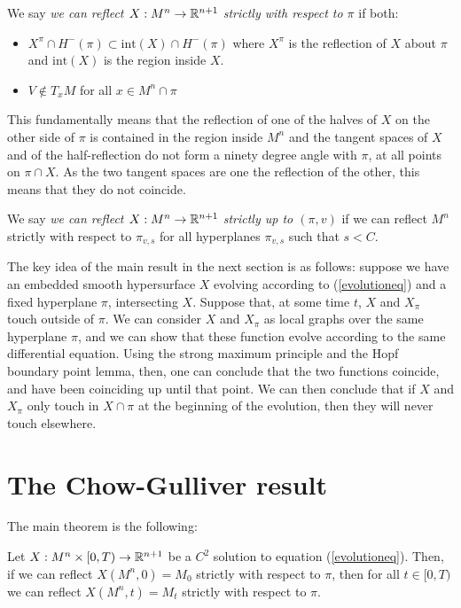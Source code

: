\begin{defin}
	We say {\em we can reflect $X: M^n\rightarrow \mathbb{R}^{n+1}$ strictly with respect to $\pi$} if both:
	\begin{itemize}
		\item $X^\pi\cap H^-(\pi)\subset \mathrm{int}(X)\cap H^-(\pi)$ where $X^\pi$ is the reflection of $X$ about $\pi$ and $\mathrm{int}(X)$ is the region inside $X$.
		\item $V\notin T_xM$ for all $x\in M^n \cap\pi$
	\end{itemize} 
\end{defin}
This fundamentally means that the reflection of one of the halves of $X$ on the other side of $\pi$ is contained in the region inside $M^n$ and the tangent spaces of $X$ and of the half-reflection do not form a ninety degree angle with $\pi$, at all points on $\pi\cap X$. As the two tangent spaces are one the reflection of the other, this means that they do not coincide.   
\begin{defin}
	We say {\em we can reflect $X: M^n\rightarrow \mathbb{R}^{n+1}$ strictly up to $(\pi,v)$} if we can reflect $M^n$ strictly with respect to $\pi_{v, s}$ for all hyperplanes $\pi_{v, s}$ such that $s<C$.  
\end{defin}

The key idea of the main result in the next section is as follows: suppose we have an embedded smooth hypersurface $X$ evolving according to (\ref{evolutioneq}) and a fixed hyperplane $\pi$, intersecting $X$. Suppose that, at some time $t$, $X$ and  $X_\pi$ touch outside of $\pi$. We can consider $X$ and  $X_\pi$ as local graphs over the same hyperplane $\pi$, and we can show that these function evolve according to the same differential equation. Using the strong maximum principle and the Hopf boundary point lemma, then, one can conclude that the two functions coincide, and have been coinciding up until that point. We can then conclude that if  $X$ and  $X_\pi$ only touch in $X\cap\pi$ at the beginning of the evolution, then they will never touch elsewhere.  


\section{The Chow-Gulliver result}

The main theorem is the following: 

\begin{theorem}\label{chow gulliver}
	Let $X:M^n\times [0,T) \rightarrow \mathbb{R}^{n+1}$ be a $C^2$ solution to equation (\ref{evolutioneq}). Then, if we can reflect $X(M^n, 0)=M_0$ strictly with respect to $\pi$, then for all $t\in [0,T)$ we can reflect $X(M^n, t)=M_t$ strictly with respect to $\pi$. 
\end{theorem}

